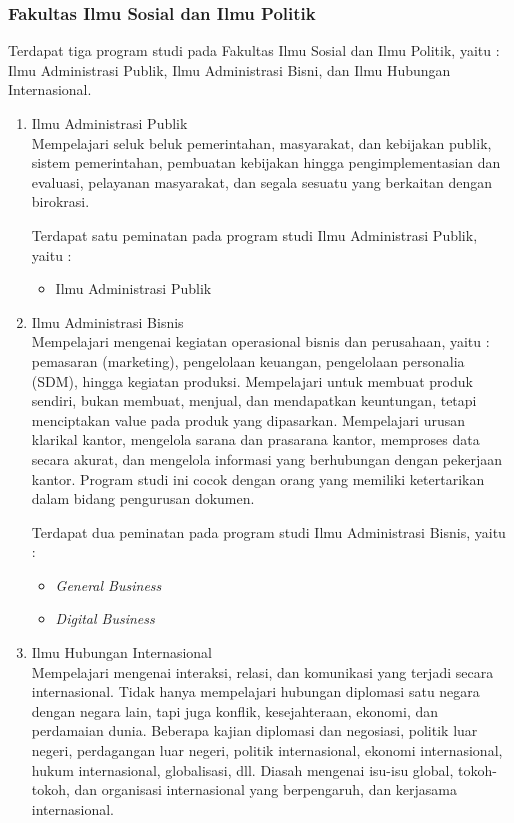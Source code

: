 \subsubsection{Fakultas Ilmu Sosial dan Ilmu Politik}
Terdapat tiga program studi pada Fakultas Ilmu Sosial dan Ilmu Politik, yaitu : Ilmu Administrasi Publik, Ilmu Administrasi Bisni, dan Ilmu Hubungan Internasional.
	\begin{enumerate}
		\item Ilmu Administrasi Publik\\
			Mempelajari seluk beluk pemerintahan, masyarakat, dan kebijakan publik, sistem pemerintahan, pembuatan kebijakan hingga pengimplementasian dan evaluasi, pelayanan masyarakat, dan segala sesuatu yang berkaitan dengan birokrasi.

			Terdapat satu peminatan pada program studi Ilmu Administrasi Publik, yaitu :
			
			\begin{itemize}
				\item Ilmu Administrasi Publik
			\end{itemize}\leavevmode
			
		\item Ilmu Administrasi Bisnis\\
			Mempelajari mengenai kegiatan operasional bisnis dan perusahaan, yaitu : pemasaran (marketing), pengelolaan keuangan, pengelolaan personalia (SDM), hingga kegiatan produksi. Mempelajari untuk membuat produk sendiri, bukan membuat, menjual, dan mendapatkan keuntungan, tetapi menciptakan value pada produk yang dipasarkan. Mempelajari urusan klarikal kantor, mengelola sarana dan prasarana kantor, memproses data secara akurat, dan mengelola informasi yang berhubungan dengan pekerjaan kantor. Program studi ini cocok dengan orang yang memiliki ketertarikan dalam bidang pengurusan dokumen.
			
			Terdapat dua peminatan pada program studi Ilmu Administrasi Bisnis, yaitu :
			
			\begin{itemize}
				\item \textit{General Business}
				\item \textit{Digital Business}
			\end{itemize}\leavevmode
						
		\item Ilmu Hubungan Internasional\\
			Mempelajari mengenai interaksi, relasi, dan komunikasi yang terjadi secara internasional. Tidak hanya mempelajari hubungan diplomasi satu negara dengan negara lain, tapi juga konflik, kesejahteraan, ekonomi, dan perdamaian dunia. Beberapa kajian diplomasi dan negosiasi, politik luar negeri, perdagangan luar negeri, politik internasional, ekonomi internasional, hukum internasional, globalisasi, dll. Diasah mengenai isu-isu global, tokoh-tokoh, dan organisasi internasional yang berpengaruh, dan kerjasama internasional.
			

\end{enumerate}

